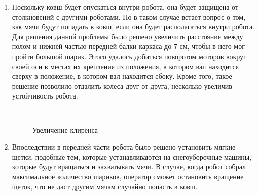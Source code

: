 \begin{enumerate}
\begin{enumerate}
      \item Поскольку ковш будет опускаться внутри робота, она будет защищена от столкновений с другими роботами. Но в таком случае встает вопрос о том, как мячи будут попадать в ковш, если она будет располагаться внутри робота. Для решения данной проблемы было решено увеличить расстояние между полом и нижней частью передней балки каркаса до 7 см, чтобы в него мог пройти большой шарик. Этого удалось добиться поворотом моторов вокруг своей оси в местах их крепления из положения, в котором вал находится сверху в положение, в котором вал находится сбоку. Кроме того, такое решение позволило отдалить колеса друг от друга, несколько увеличив устойчивость робота.\newline
      
      \begin{figure}[H]
      	\begin{minipage}[h]{1\linewidth}
      		\caption{Увеличение клиренса} 
      	\end{minipage}
      \end{figure}
        
      \item Впоследствии в передней части робота было решено установить мягкие щетки, подобные тем, которые устанавливаются на снегоуборочные машины, которые будут вращаться и захватывать мячи. В случае, когда робот собрал максимальное количество шариков, оператор сможет остановить вращение щеток, что не даст другим мячам случайно попасть в ковш.\newline
      

\end{enumerate}
\end{enumerate}
